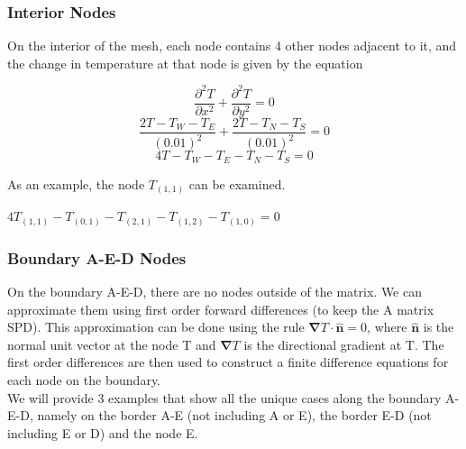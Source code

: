 \documentclass[12pt,a4paper]{article}
\begin{document}
\subsubsection{Interior Nodes}
On the interior of the mesh, each node contains 4 other nodes adjacent to it, and the change in temperature at that node is given by the equation
\begin{center}
\[\frac{\partial^2 T}{\partial x^2}+\frac{\partial^2 T}{\partial y^2}=0\]
\[\frac{2T-T_W-T_E}{(0.01)^2}+\frac{2T-T_N-T_S}{(0.01)^2}=0\]
\[4T-T_W-T_E-T_N-T_S=0\]
\end{center}
\begin{center}
\end{center}
As an example, the node $T_{(1,1)}$ can be examined.
\begin{center}
  $4T_{(1,1)}-T_{(0,1)}-T_{(2,1)}-T_{(1,2)}-T_{(1,0)}=0$
\end{center}
\subsubsection{Boundary A-E-D Nodes}
On the boundary A-E-D, there are no nodes outside of the matrix. We can approximate them using first order forward differences (to keep the A matrix SPD). This approximation can be done using the rule $\boldsymbol{\nabla} T \cdot {\hat{\textbf{n}}} = 0$, where ${\hat{\textbf{n}}}$ is the normal unit vector at the node T and $\boldsymbol{\nabla} T$ is the directional gradient at T. The first order differences are then used to construct a finite difference equations for each node on the boundary.\\We will provide 3 examples that show all the unique cases along the boundary A-E-D, namely on the border A-E (not including A or E), the border E-D (not including E or D) and the node E.
\end{document}
